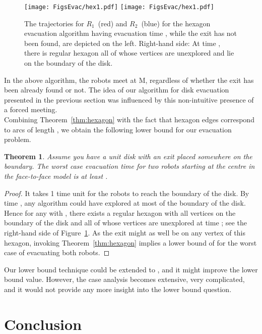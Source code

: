 \documentclass[
final
]{dmtcs-episciences}
\newcommand{\RA}{\ensuremath{R_1}}
\newcommand{\RB}{\ensuremath{R_2 }}
\newcommand{\ff}{face-to-face }
\newtheorem{theorem}{Theorem}[section]
\theoremstyle{definition}
\begin{document}
\begin{figure}[!ht]
                \centering
 \vspace{-2ex}
 \texttt{[image: FigsEvac/hex1.pdf]} \hspace{1cm}
                \texttt{[image: FigsEvac/hex1.pdf]}
				\caption{The trajectories for \RA~(red) and \RB~(blue) for the hexagon evacuation algorithm having evacuation time , 					while the exit has not been found, are depicted on the left.
					Right-hand side: At time , there is regular hexagon all of whose vertices are unexplored and lie on the boundary of the disk.
				}
				\label{fig:hex_ub}
\end{figure}

In the above algorithm, the robots meet at M, regardless of  whether the exit has been already found or not. 
The idea of our algorithm for disk evacuation presented in the previous section was influenced by this non-intuitive presence of a forced meeting. \\
Combining Theorem~\ref{thm:hexagon} with the fact that hexagon edges correspond to arcs of length , we obtain the following lower bound for our evacuation problem.

\begin{theorem}
Assume you have a unit disk with an exit placed somewhere on the boundary. 
The worst case evacuation time  for two robots starting at the centre in the \ff model 
  is at least . \end{theorem}
\begin{proof}
It takes 1 time unit for the robots to reach the boundary of the disk.
By time ,
any algorithm could have explored at most  of the boundary of the disk. 
Hence for any  with , there exists a regular hexagon with all vertices on the boundary of the disk and all of whose vertices are unexplored at time ; see the right-hand side of Figure~\ref{fig:hex_ub}. 
As the exit might as well be on any vertex of this hexagon, invoking Theorem~\ref{thm:hexagon} implies a lower bound of  for the worst case of evacuating both robots. 
\end{proof}

Our lower bound technique could be extended to , and it might 
improve the lower bound value. However, the case analysis becomes 
extensive,
very complicated, and it would not provide any more insight into the 
lower bound question.



\section{Conclusion}
\label{sec:Conclusion}
\end{document}
